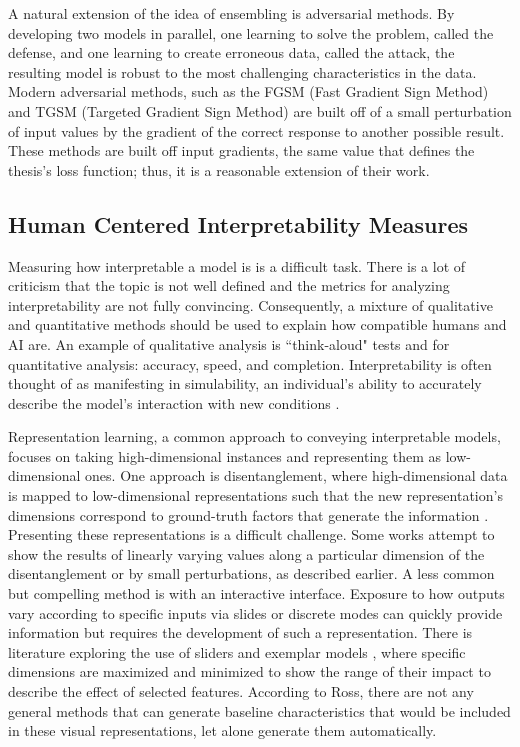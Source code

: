 \documentclass[twoside,11pt]{article}
\begin{document}
A natural extension of the idea of ensembling is adversarial methods. By developing two models in parallel, one learning to solve the problem, called the defense, and one learning to create erroneous data, called the attack, the resulting model is robust to the most challenging characteristics in the data. Modern adversarial methods, such as the FGSM (Fast Gradient Sign Method) \citep{goodfellow2014generative} and TGSM (Targeted Gradient Sign Method) \citep{kurakin2016adversarial} are built off of a small perturbation of input values by the gradient of the correct response to another possible result. These methods are built off input gradients, the same value that defines the thesis's loss function; thus, it is a reasonable extension of their work.

\subsection{Human Centered Interpretability Measures}
Measuring how interpretable a model is is a difficult task. There is a lot of criticism that the topic is not well defined \citep{lipton2018mythos} and the metrics for analyzing interpretability are not fully convincing. Consequently, a mixture of qualitative and quantitative methods should be used to explain how compatible humans and AI are. An example of qualitative analysis is ``think-aloud" tests \citep{lewis1982using} and for quantitative analysis: accuracy, speed, and completion. Interpretability is often thought of as manifesting in simulability, an individual's ability to accurately describe the model's interaction with new conditions \citep{miller2019explanation}. 

Representation learning, a common approach to conveying interpretable models, focuses on taking high-dimensional instances and representing them as low-dimensional ones. One approach is disentanglement, where high-dimensional data is mapped to low-dimensional representations such that the new representation's dimensions correspond to ground-truth factors that generate the information \citep{bengio2013representation}. Presenting these representations is a difficult challenge. Some works attempt to show the results of linearly varying values along a particular dimension of the disentanglement \citep{chen2016infogan} or by small perturbations, as described earlier. A less common but compelling method is with an interactive interface. Exposure to how outputs vary according to specific inputs via slides or discrete modes can quickly provide information but requires the development of such a representation. There is literature exploring the use of sliders and exemplar models \citep{olah2017feature}, where specific dimensions are maximized and minimized to show the range of their impact to describe the effect of selected features. According to Ross, there are not any general methods that can generate baseline characteristics that would be included in these visual representations, let alone generate them automatically.
\end{document}
